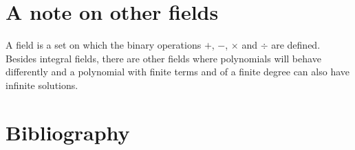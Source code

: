 \documentclass[12pt]{article}
\begin{document}
\section*{A note on other fields}
A field is a set on which the binary operations $+$, $-$, $\times$ and $\div$ are defined.
Besides integral fields, there are other fields where polynomials will behave differently and a polynomial with finite terms and of a finite degree can also have infinite solutions.





\appendix
\section*{Bibliography}







\end{document}
